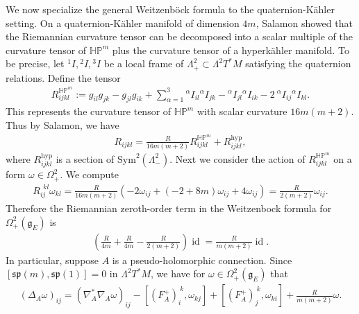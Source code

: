 \documentclass[12pt]{amsart}
\renewcommand{\1}{{\mathbf 1}}
\theoremstyle{others}
\numberwithin{equation}{section}
\begin{document}
We now specialize the general Weitzenb{\"o}ck formula to the quaternion-K{\"a}hler setting. On a quaternion-K{\"a}hler manifold of dimension \(4m\), Salamon \cite[Theorem 3.1]{salamonqkinventiones} showed that the Riemannian curvature tensor can be decomposed into a scalar multiple of the curvature tensor of \(\mathbb{HP}^m\) plus the curvature tensor of a hyperk{\"a}hler manifold. To be precise, let \({}^1 I, {}^2 I, {}^3 I\) be a local frame of 
\(\Lambda_+^2 \subset \Lambda^2T^\ast M\) satisfying the quaternion relations. Define the tensor
\begin{align*}
    R_{ijkl}^{\mathbb{HP}^m} := g_{il}g_{jk} -  g_{jl}g_{ik} + \sum_{\alpha = 1}^3 {}^\alpha I_{il}{}^\alpha I_{jk} - {}^\alpha I_{jl}{}^\alpha I_{ik} - 2 \ {}^\alpha I_{ij}{}^\alpha I_{kl}.
\end{align*} This represents the curvature tensor of \(\mathbb{HP}^m\) with scalar curvature \(16m(m+2)\). Thus by Salamon, we have
\begin{align*}
    R_{ijkl} = \frac{R}{16m(m+2)} R_{ijkl}^{\mathbb{HP}^m} + R_{ijkl}^{\text{hyp}},
\end{align*} where \(R_{ijkl}^{\text{hyp}}\) is a section of $\text{Sym}^2\left(\Lambda_-^2\right).$ %
Next we consider the action of \(R_{ijkl}^{\mathbb{HP}^m}\) on a form \(\omega \in \Omega_+^2.\) %
We compute
\begin{align*}
    R_{ij}^{\ \ kl} \omega_{kl} = \frac{R}{16m(m+2)}(-2\omega_{ij} + (-2 + 8m)\omega_{ij} + 4\omega_{ij}) = \frac{R}{2(m+2)} \omega_{ij}.
\end{align*} Therefore the Riemannian zeroth-order term in the Weitzenbock formula for \(\Omega_+^2(\mathfrak{g}_E)\) is
\begin{align*}
    \left(\frac{R}{4m} + \frac{R}{4m} -\frac{R}{2(m+2)}\right) \operatorname{id} = \frac{R}{m(m+2)}\operatorname{id}. %
\end{align*} In particular, suppose \(A\) is a pseudo-holomorphic connection. Since \([\mathfrak{sp}(m), \mathfrak{sp}(1)] = 0\) in \(\Lambda^2T^\ast M\), we have for \(\omega \in \Omega_+^2(\mathfrak{g}_E)\) that
\begin{align}\label{preliminaries:qkweitzenbock}
    (\Delta_A \omega)_{ij} = (\nabla_A^\ast \nabla_A \omega)_{ij} - [(F_A^+)_i^{\ k}, \omega_{kj}] + [(F_A^+)_j^{\ k}, \omega_{ki}] + \frac{R}{m(m+2)}\omega.
\end{align}

\end{document}
